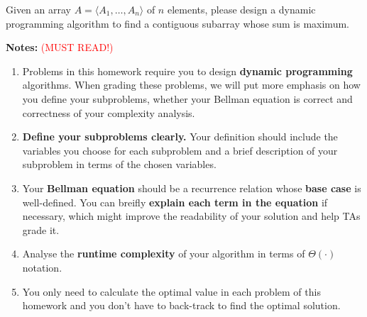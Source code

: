 
Given an array $A=\langle A_1, \dots, A_n\rangle$ of $n$ elements, please design a dynamic programming algorithm to find a contiguous subarray whose sum is maximum.

\vspace{0.05in}
{\large\textbf{Notes:}} \textcolor{red}{(MUST READ!)}

\begin{enumerate}
    \item Problems in this homework require you to design \textbf{dynamic programming} algorithms. When grading these problems, we will put more emphasis on how you define your subproblems, whether your Bellman equation is correct and correctness of your complexity analysis.
    \item \textbf{Define your subproblems clearly.} Your definition should include the variables you choose for each subproblem and a brief description of your subproblem in terms of the chosen variables.
    \item Your \textbf{Bellman equation} should be a recurrence relation whose \textbf{base case} is well-defined. You can breifly \textbf{explain each term in the equation} if necessary, which might improve the readability of your solution and help TAs grade it. 
    \item Analyse the \textbf{runtime complexity} of your algorithm in terms of $\Theta(\cdot)$ notation.
    \item You only need to calculate the optimal value in each problem of this homework and you don't have to back-track to find the optimal solution.
\end{enumerate}

\newcommand{\maxi}[2]{\max\left\{\substack{#1\\#2}\right\}}	%
\newcommand{\mini}[2]{\min\left\{\substack{#1\\#2}\right\}}	%
\newcommand{\case}[1]{\text{if}\ #1}	%
\newcommand{\otherwise}{\text{otherwise}}	%

